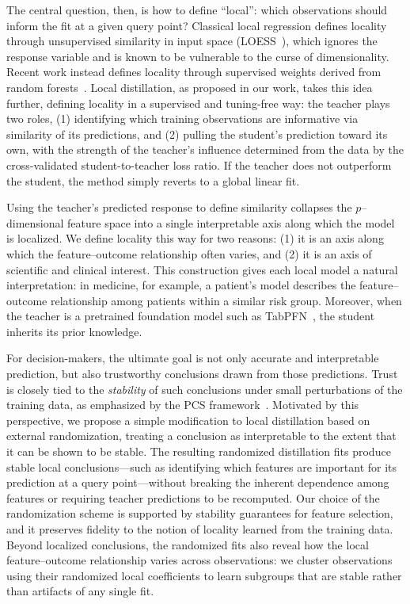 \documentclass[12pt]{article}
\theoremstyle{definition}
\begin{document}
The central question, then, is how to define ``local'': which observations should inform the fit at a given query point? 
Classical local regression defines locality through unsupervised similarity in input space (LOESS~\cite{cleveland1988locally}), which ignores the response variable and is known to be vulnerable to the curse of dimensionality.
Recent work instead defines locality through supervised weights derived from random forests~\cite{qiu2024random, bloniarz2016supervised, friedberg2020local, athey2019generalized}. 
Local distillation, as proposed in our work, takes this idea further, defining locality in a supervised and tuning-free way: the teacher plays two roles, (1) identifying which training observations are informative via similarity of its predictions, and (2) pulling the student's prediction toward its own, with the strength of the teacher's influence determined from the data by the cross-validated student-to-teacher loss ratio. If the teacher does not outperform the student, the method simply reverts to a global linear fit.

Using the teacher's predicted response to define similarity collapses the $p$--dimensional feature space into a single interpretable axis along which the model is localized. 
We define locality this way for two reasons: (1) it is an axis along which the feature--outcome relationship often varies, and (2) it is an axis of scientific and clinical interest. 
This construction gives each local model a natural interpretation: in medicine, for example, a patient's model describes the feature–outcome relationship among patients within a similar risk group. 
Moreover, when the teacher is a pretrained foundation model such as TabPFN~\cite{hollmann2025accurate}, the student inherits its prior knowledge.

For decision-makers, the ultimate goal is not only accurate and interpretable prediction, but also trustworthy conclusions drawn from those predictions.
Trust is closely tied to the \textit{stability} of such conclusions under small perturbations of the training data, as emphasized by the PCS framework~\cite{yu2013stability, yu2020veridical, rewolinski2025pcs}.
Motivated by this perspective, we propose a simple modification to local distillation based on external randomization, treating a conclusion as interpretable to the extent that it can be shown to be stable.
The resulting randomized distillation fits produce stable local conclusions---such as identifying which features are important for its prediction at a query point---without breaking the inherent dependence among features or requiring teacher predictions to be recomputed.
Our choice of the randomization scheme is supported by stability guarantees for feature selection, and it preserves fidelity to the notion of locality learned from the training data.
Beyond localized conclusions, the randomized fits also reveal how the local feature–outcome relationship varies across observations: we cluster observations using their randomized local coefficients to learn subgroups that are stable rather than artifacts of any single fit.
\end{document}
